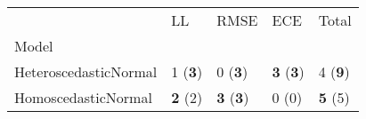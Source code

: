 \begin{tabular}{lllll}
\toprule
{} &              LL &                     RMSE &                      ECE &           Total \\
Model                 &                 &                          &                          &                 \\
\midrule
HeteroscedasticNormal &  1 (\textbf{3}) &           0 (\textbf{3}) &  \textbf{3} (\textbf{3}) &  4 (\textbf{9}) \\
HomoscedasticNormal   &  \textbf{2} (2) &  \textbf{3} (\textbf{3}) &                    0 (0) &  \textbf{5} (5) \\
\bottomrule
\end{tabular}

